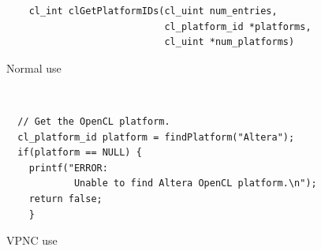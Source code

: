 \documentclass{article}
\begin{document}
  \begin{lstlisting}
    cl_int clGetPlatformIDs(cl_uint num_entries,
                            cl_platform_id *platforms,
                            cl_uint *num_platforms)
  \end{lstlisting}
  \caption{Normal use}
  \label{lst:Scarpino}

  \

  \begin{lstlisting}
  // Get the OpenCL platform.
  cl_platform_id platform = findPlatform("Altera");
  if(platform == NULL) {
    printf("ERROR:
            Unable to find Altera OpenCL platform.\n");
    return false;
    }
  \end{lstlisting}
  \caption{VPNC use}
\end{document}
